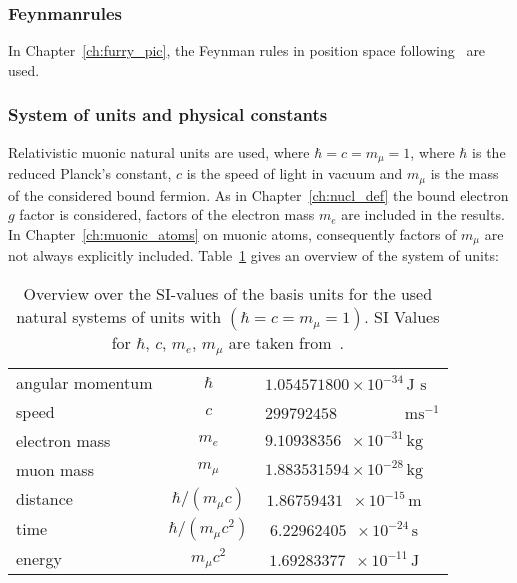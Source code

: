 \subsubsection*{Feynmanrules}
In Chapter~\ref{ch:furry_pic}, the Feynman rules in position space following~\cite{itzykson2005} are used.

\newpage
\subsubsection*{System of units and physical constants}
Relativistic muonic natural units are used, where $\hbar=c=m_\mu=1$, where $\hbar$ is the reduced Planck's constant, $c$ is the speed of light in vacuum and $m_\mu$ is the mass of the considered bound fermion. As in Chapter~\ref{ch:nucl_def} the bound electron $g$ factor is considered, factors of the electron mass $m_e$ are included in the results. In Chapter~\ref{ch:muonic_atoms} on muonic atoms, consequently factors of $m_\mu$ are not always explicitly included. Table~\ref{tab:units} gives an overview of the system of units:\\[1.5cm]

\begin{table}[h]
\caption{\label{tab:units}Overview over the SI-values of the basis units for the used natural systems of units with $(\hbar=c=m_\mu=1)$. SI Values for $\hbar$, $c$, $m_e$, $m_\mu$ are taken from~\cite{codata2016}.}
\centering\setcellgapes{4pt}\makegapedcells
\begin{tabular}{lc|cc}
\\
angular momentum &$\hbar$ & \multicolumn{2}{l}{$1.054571800 \times 10^{-34} \,\text{J s}$} \\
speed &$c$ & \multicolumn{2}{l}{$299792458 \,\phantom{\times 1001 ^{-34}} \text{ms}^{-1}$}\\
electron mass &$m_e$ & \multicolumn{2}{l}{$9.10938356\phantom{0}\times 10^{-31}\, \text{kg} $}\\
muon mass &$m_\mu$ & \multicolumn{2}{l}{$1.883531594 \times 10^{-28} \,\text{kg}$}\\[15pt]
distance & $\hbar/(m_\mu c)$ & $1.86759431\phantom{1}\times 10^{-15}\,\text{m}$\\
time & $\hbar /(m_\mu c^2)$ & $6.22962405\phantom{1}\times 10^{-24}\,\text{s}$\\
energy & $m_\mu c^2$ & $1.69283377\phantom{1}\times 10^{-11}\,\text{J}$\\
\end{tabular}
\end{table}

